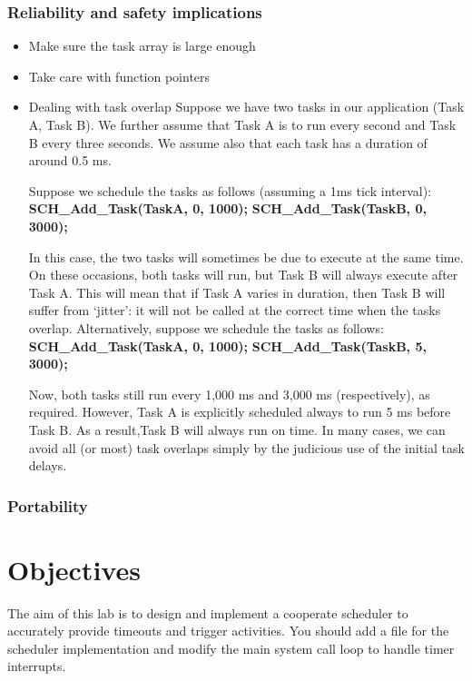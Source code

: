 \subsubsection{Reliability and safety implications}
\begin{itemize}
    \item Make sure the task array is large enough
    \item Take care with function pointers
    \item Dealing with task overlap
    \subitem Suppose we have two tasks in our application (Task A, Task B). We further assume that Task A is to run every second and Task B every three seconds. We assume also that
each task has a duration of around 0.5 ms.  

    \subitem Suppose we schedule the tasks as follows (assuming a 1ms tick interval):
        \subsubitem \textbf{SCH\_Add\_Task(TaskA, 0, 1000);}
        \subsubitem \textbf{SCH\_Add\_Task(TaskB, 0, 3000);}

\subitem In this case, the two tasks will sometimes be due to execute at the same time. On
these occasions, both tasks will run, but Task B will always execute after Task A. This will mean that if Task A varies in duration, then Task B will suffer from ‘jitter’: it will not be called at the correct time when the tasks overlap.
\subitem Alternatively, suppose we schedule the tasks as follows:
\subsubitem \textbf{SCH\_Add\_Task(TaskA, 0, 1000);}
\subsubitem \textbf{SCH\_Add\_Task(TaskB, 5, 3000);}

\subitem Now, both tasks still run every 1,000 ms and 3,000 ms (respectively), as required. However, Task A is explicitly scheduled always to run 5 ms before Task B. As a result,Task B will always run on time.
\subitem In many cases, we can avoid all (or most) task overlaps simply by the judicious use
of the initial task delays.

\end{itemize}






\subsubsection{Portability}
\section{Objectives}
The aim of this lab is to design and implement a cooperate scheduler to accurately provide timeouts and trigger activities. You should add a file for the scheduler implementation and modify the main system call loop to handle timer interrupts.

